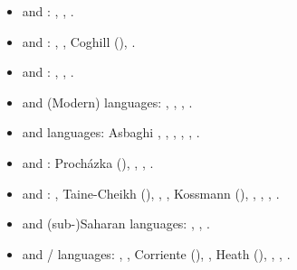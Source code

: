 \documentclass[output=paper]{langsci/langscibook}
\begin{document}
\begin{itemize}[noitemsep,leftmargin=11pt]
\item[\adfhalfrightarrowhead] and : \citet{Retsö2011}, \citet{Weninger2011Aramaic}, \citet{Owens2016Aramaic}.

\item[\adfhalfrightarrowhead] and :
\citet{ArnoldBehnstedt1993}, \citet{Arnold2007}, Coghill (\citeyear{Coghill2010,Coghill2012,Coghill2015}), \citet{Jastrow2015}.

\item[\adfhalfrightarrowhead] and :
\citet{Blau1981}, \citet{Yoda2013}, \citet{Horesh2015}.

\item[\adfhalfrightarrowhead] and (Modern)  languages: \citet{Diem1979}, \citet{Lonnet2011}, \citet{Zammit2011}, \citet{Watson2018}.

\item[\adfhalfrightarrowhead] and  languages: Asbaghi \citet{Asbaghi2011}, \citet{Tsabolov1994}, \citet{Matras2007Domari}, \citet{Gazsi2011}, \citet{WalAnonby2015}, \citet{Herin2018}.

\item[\adfhalfrightarrowhead] and : Procházka (\citeyear{Procházka2002Adana,Procházka2011Turkish}), \citet{Haig2014}, \citet{Taylan2017}, \citet{AkkusBenmamoun2018}.


\item[\adfhalfrightarrowhead] and : \citet{Corriente2002}, Taine-Cheikh (\citeyear{Taine-Cheikh1997Zenaga,Taine-Cheikh2018quadri}), \citet{Brahimi2000}, \citet{LafkiouiBrugnatelli2008}, Kossmann
(\citeyear{Kossmann2009,Kossmann2010,Kossmann2013book}), \citet{ElAissati2011}, \citet{Lafkioui2013reinventing}, \citet{Souag2013book},  \citet{vanPuttenSouag2015}.

\item[\adfhalfrightarrowhead] and (sub-)Saharan languages: \citet{Owens2000article,Owens2015}, \citet{Lafkioui2013book}, \citet{Souag2016sahara}.


\item[\adfhalfrightarrowhead] and / languages: \citet{Brunot1949}, \citet{Benoliel1977}, Corriente (\citeyear{Corriente1978,Corriente1992book}), \citet{Talmoudi1986}, Heath (\citeyear{Heath1989,Heath2015}), \citet{Cifoletti1994}, \citet{Vicente2006}, \citet{Sayahi2014}.


\end{itemize}
\end{document}
